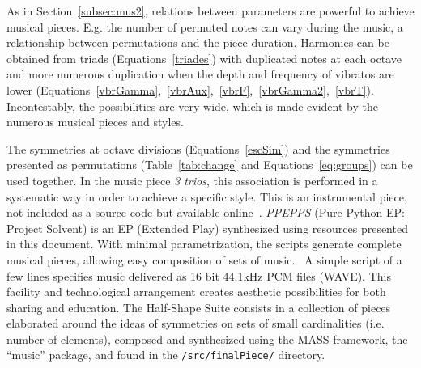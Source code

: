 \documentclass[format=acmsmall, review=false, screen=true]{acmart}
\begin{document}
As in Section~\ref{subsec:mus2}, relations between
parameters are powerful to achieve musical pieces.
E.g. the number of permuted
notes can vary during the music, a relationship between permutations and the piece
duration. Harmonies can be obtained from triads (Equations~\ref{triades}) with duplicated
notes at each octave and more numerous duplication when the depth and frequency of
vibratos are lower (Equations~\ref{vbrGamma},~\ref{vbrAux},~\ref{vbrF},~\ref{vbrGamma2},~\ref{vbrT}).
Incontestably, the possibilities are very wide, which is made evident by the numerous musical pieces and styles.

The symmetries at octave divisions (Equations~\ref{escSim}) and the
symmetries presented as permutations (Table~\ref{tab:change} and
Equations~\ref{eq:groups}) can be used together. In the music piece \emph{3 trios},
this association is performed in a systematic way in order to achieve a specific style.
This is an instrumental piece, not included as a source code but available online~\cite{3Trios}.
\emph{PPEPPS} (Pure Python EP: Project Solvent) is an EP (Extended Play) synthesized using
resources presented in this document. With minimal parametrization, the scripts
generate complete musical pieces, allowing easy composition of sets of
music.~\cite{figgus} A simple script of a few lines specifies music delivered as 16 bit
44.1kHz PCM files (WAVE). This facility and technological
arrangement creates aesthetic possibilities for both sharing and education.
The Half-Shape Suite consists in a collection of pieces elaborated around the ideas of symmetries on sets of small cardinalities (i.e. number of elements), composed and synthesized using the MASS framework, the ``music'' package, and found in the \texttt{/src/finalPiece/} directory.~\cite{MASSA,music,halfSuite}

% 


\end{document}
